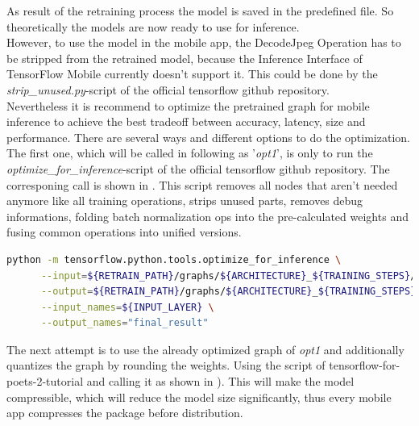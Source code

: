 As result of the retraining process the model is saved in the predefined file. So theoretically the models are now ready to use for inference. \\



However, to use the model in the mobile app, the DecodeJpeg Operation has to be stripped from the retrained model, because the Inference Interface of TensorFlow Mobile currently doesn't support it. This could be done by the \textit{strip_unused.py}-script of the official tensorflow github repository. \\

Nevertheless it is recommend to optimize the pretrained graph for mobile inference to achieve the best tradeoff between accuracy, latency, size and performance. There are several ways and different options to do the optimization. \\

The first one, which will be called in following as '\textit{opt1}', is only to run the \textit{optimize_for_inference}-script of the official tensorflow github repository. The corresponing call is shown in .
This script removes all nodes that aren't needed anymore like all training operations, strips unused parts, removes debug informations, folding batch normalization ops into the pre-calculated weights and fusing common operations into unified versions.
 
\begin{minipage}{\linewidth}
\begin{lstlisting}[caption=Call of \textit{optimize_for_inference.py}, label=list:optimize_graph, language=bash]
	python -m tensorflow.python.tools.optimize_for_inference \
	  --input=${RETRAIN_PATH}/graphs/${ARCHITECTURE}_${TRAINING_STEPS}/retrained_dog_graph_${ARCHITECTURE}_${TRAINING_STEPS}_${LEARNING_RATE}.pb \
	  --output=${RETRAIN_PATH}/graphs/${ARCHITECTURE}_${TRAINING_STEPS}/opt1_retrained_dog_graph_${ARCHITECTURE}_${TRAINING_STEPS}_${LEARNING_RATE}.pb \
	  --input_names=${INPUT_LAYER} \
	  --output_names="final_result"
\end{lstlisting}
\end{minipage}

The next attempt is to use the already optimized graph of \textit{opt1} and additionally quantizes the graph by rounding the weights. Using the script of tensorflow-for-poets-2-tutorial and calling it as shown in ). This will make the model compressible, which will reduce the model size significantly, thus every mobile app compresses the package before distribution.

